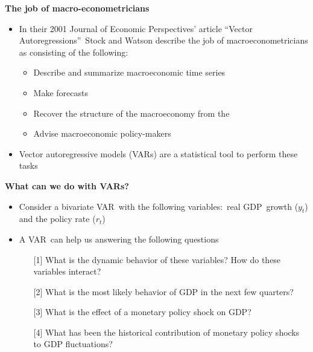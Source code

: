 \begin{frame}
{\textbf{The job of macro-econometricians}}\bigskip \bigskip \medskip

\begin{itemize}
\item In their 2001 Journal of Economic Perspectives' article
\textquotedblleft Vector Autoregressions\textquotedblright\ Stock and Watson
describe the job of macroeconometricians as consisting of the
following:\smallskip

\begin{itemize}
\item Describe and summarize macroeconomic time series\medskip

\item Make forecasts\medskip

\item Recover the structure of the macroeconomy from the {%
}\medskip

\item Advise macroeconomic policy-makers\bigskip \pause
\end{itemize}

\item Vector autoregressive models (VARs) are a statistical tool to perform
these tasks
\end{itemize}

\end{frame}


\begin{frame}
{\textbf{What can we do with VARs?}}\bigskip \bigskip \medskip

\begin{itemize}
\item Consider a bivariate VAR\ with the following variables:\ real GDP\
growth ($y_{t}$) and the policy rate ($r_{t}$)\bigskip \medskip \pause

\item A VAR\ can help us answering the following questions\smallskip

\begin{enumerate}
\item[{[1]}] What is the dynamic behavior of these variables? How do these
variables interact?\medskip

\item[{[2]}] What is the most likely behavior of GDP in the next few
quarters? \medskip

\item[{[3]}] What is the effect of a monetary policy shock on GDP?\medskip

\item[{[4]}] What has been the historical contribution of monetary policy
shocks to GDP fluctuations?
\end{enumerate}
\end{itemize}
\end{frame}

